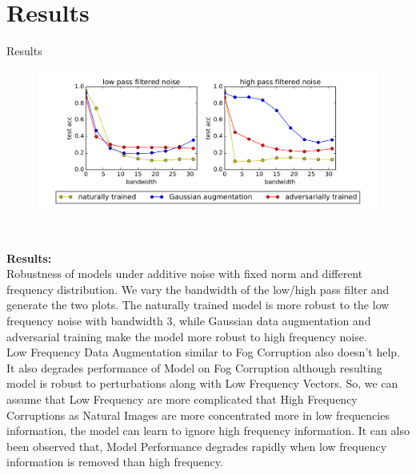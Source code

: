 \documentclass[8pt]{beamer}
\begin{document}
\section{Results}
\begin{frame}[allowframebreaks]{Results}
\begin{figure}
    \centering
    \includegraphics[scale=0.3]{../Images/Observations.png}
\end{figure}\\

\framebreak

\textbf{Results:}\\
Robustness of models under additive noise with fixed norm and different frequency distribution. We vary the bandwidth of the low/high pass filter and generate the two plots. The naturally trained model is more robust to the low frequency noise with bandwidth 3, while Gaussian data augmentation and adversarial training make the model more robust to high frequency noise.\\
\vspace{0.1in}
\qquad Low Frequency Data Augmentation similar to Fog Corruption also doesn't help. It also degrades performance of Model on Fog Corruption although resulting model is robust to perturbations along with Low Frequency Vectors. So, we can assume that Low Frequency are more complicated that High Frequency Corruptions as Natural Images are more concentrated more in low frequencies information, the model can learn to ignore high frequency information. It can also been observed that, Model Performance degrades rapidly when low frequency information is removed than high frequency.\\

\end{frame}
\end{document}
